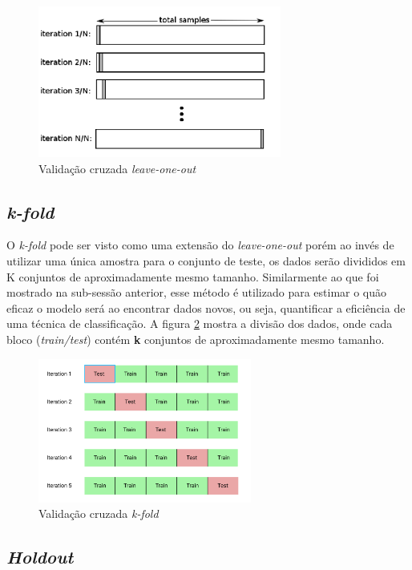 \documentclass[paper=a4, fontsize=11pt]{scrartcl}
\numberwithin{equation}{section}		%
\numberwithin{figure}{section}			%
\numberwithin{table}{section}				%
\begin{document}
\begin{figure}[h]
    \includegraphics[width=8cm]{img/Leave-One-Out-Cross-Validation.png}
    \centering
    \caption{Validação cruzada \textit{leave-one-out}}
    \label{fig:loo}
\end{figure}

\subsection{\textit{k-fold}}

O \textit{k-fold} pode ser visto como uma extensão do \textit{leave-one-out} porém ao invés de utilizar uma única amostra para o conjunto de teste, os dados serão divididos em K conjuntos de aproximadamente mesmo tamanho. Similarmente ao que foi mostrado na sub-sessão anterior, esse método é utilizado para estimar o quão eficaz o modelo será ao encontrar dados novos, ou seja, quantificar a eficiência de uma técnica de classificação. A figura \ref{fig:kfold} mostra a divisão dos dados, onde cada bloco (\textit{train/test}) contém \textbf{k} conjuntos de aproximadamente mesmo tamanho.

\begin{figure}[h!]
    \includegraphics[width=7cm]{img/k-fold1.png}
    \centering
    \caption{Validação cruzada \textit{k-fold}}
    \label{fig:kfold}
\end{figure}

\subsection{\textit{Holdout}}
\end{document}
